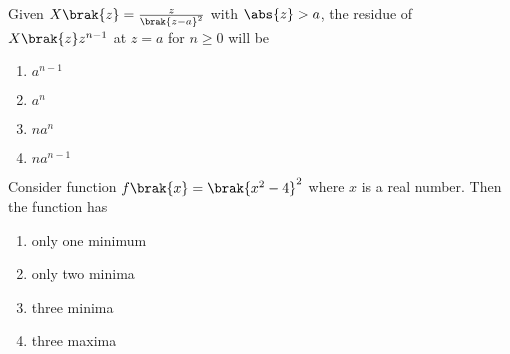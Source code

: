       \item Given $X\brak{z}=\frac{z}{\brak{z-a}^2}$ with $\abs{z}>a$, the residue of $X\brak{z}z^{n-1}$ at $z=a$ for $n\geq 0$ will be
      \begin{enumerate}
          \item $a^{n-1}$
          \item $a^n$
          \item $n a^n$
          \item $na^{n-1}$
      \end{enumerate}
      \item Consider function $f\brak{x}=\brak{x^2-4}^2$ where $x$  is a real number. Then the function has
      \begin{enumerate}
          \item only one minimum
          \item only two minima
          \item three minima
          \item three maxima
      \end{enumerate}


